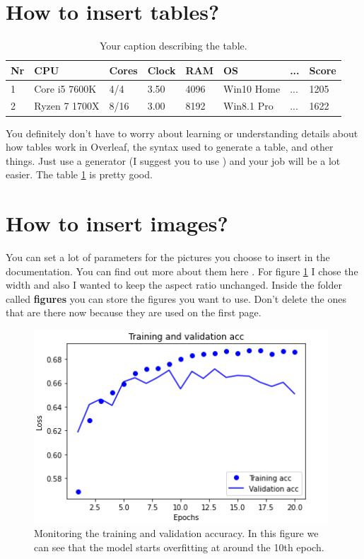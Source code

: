 \section{How to insert tables?}

\begin{table}[ht]
\centering
\begin{tabular}{|l|l|l|l|l|l|l|l|}
\hline
\textbf{Nr} & \textbf{CPU}  & \textbf{Cores} & \textbf{Clock} & \textbf{RAM} & \textbf{OS} & \textbf{...} & \textbf{Score} \\ \hline
1           & Core i5 7600K & 4/4            & 3.50           & 4096         & Win10 Home  & ...          & 1205           \\ \hline
2           & Ryzen 7 1700X & 8/16           & 3.00           & 8192         & Win8.1 Pro  & ...          & 1622           \\ \hline
\end{tabular}
\caption{Your caption describing the table.}
\label{example-table}
\end{table}

You definitely don't have to worry about learning or understanding details about how tables work in Overleaf, the syntax used to generate a table, and other things. Just use a generator (I suggest you to use \cite{table-generator}) and your job will be a lot easier. The table \ref{example-table} is pretty good.

\section{How to insert images?}

You can set a lot of parameters for the pictures you choose to insert in the documentation. You can find out more about them here \cite{image-documentation}. For figure \ref{statistics-diagram} I chose the width and also I wanted to keep the aspect ratio unchanged. Inside the folder called \textbf{figures} you can store the figures you want to use. Don't delete the ones that are there now because they are used on the first page.

\begin{figure}[H]
    \centering
    \includegraphics[width=11cm,keepaspectratio]{figures/training.png}
    \caption{Monitoring the training and validation accuracy. In this figure we can see that the model starts overfitting at around the 10th epoch.}
    \label{statistics-diagram}
\end{figure}